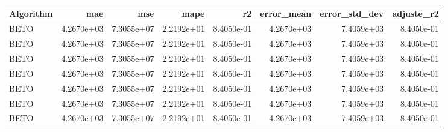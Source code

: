 \begin{tabular}{lrrrrrrr}
\toprule
Algorithm & mae & mse & mape & r2 & error_mean & error_std_dev & adjuste_r2 \\
\midrule
BETO & 4.2670e+03 & 7.3055e+07 & 2.2192e+01 & 8.4050e-01 & 4.2670e+03 & 7.4059e+03 & 8.4050e-01 \\
BETO & 4.2670e+03 & 7.3055e+07 & 2.2192e+01 & 8.4050e-01 & 4.2670e+03 & 7.4059e+03 & 8.4050e-01 \\
BETO & 4.2670e+03 & 7.3055e+07 & 2.2192e+01 & 8.4050e-01 & 4.2670e+03 & 7.4059e+03 & 8.4050e-01 \\
BETO & 4.2670e+03 & 7.3055e+07 & 2.2192e+01 & 8.4050e-01 & 4.2670e+03 & 7.4059e+03 & 8.4050e-01 \\
BETO & 4.2670e+03 & 7.3055e+07 & 2.2192e+01 & 8.4050e-01 & 4.2670e+03 & 7.4059e+03 & 8.4050e-01 \\
BETO & 4.2670e+03 & 7.3055e+07 & 2.2192e+01 & 8.4050e-01 & 4.2670e+03 & 7.4059e+03 & 8.4050e-01 \\
BETO & 4.2670e+03 & 7.3055e+07 & 2.2192e+01 & 8.4050e-01 & 4.2670e+03 & 7.4059e+03 & 8.4050e-01 \\
\bottomrule
\end{tabular}
